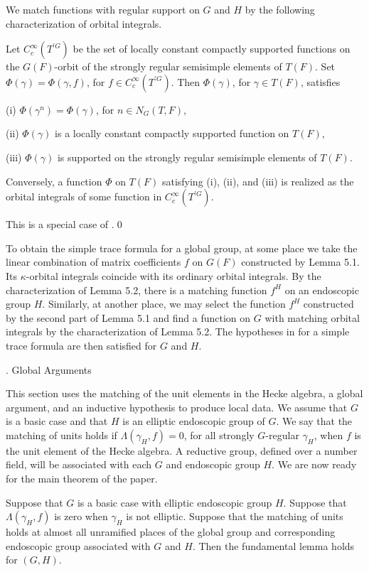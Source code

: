We match functions with regular support on $G$ and $H$ by
the following characterization of orbital integrals.

  Let $C_c^\infty(T^{'G})$ be the set of locally
constant
compactly supported functions on the $G(F)$-orbit of the
strongly regular semisimple elements of $T(F)$.  Set
$\Phi(\gamma) = \Phi(\gamma,f)$, for $f\in C_c^\infty(T^{'G})$.
Then $\Phi(\gamma)$, for $\gamma\in T(F)$,  satisfies

(i)  $\Phi(\gamma^n) = \Phi(\gamma)$, for $n\in N_G(T,F)$,

(ii) $\Phi(\gamma)$ is a locally constant compactly supported
	function on $T(F)$,

(iii) $\Phi(\gamma)$ is supported on the strongly regular semisimple
	elements of $T(F)$.

Conversely, a function $\Phi$ on $T(F)$
satisfying (i), (ii), and (iii) is realized
as the
orbital integrals of some function in $C_c^\infty(T^{'G})$.
\endproclaim

  This is a special case of \cite{Vi}.\qed
\enddemo

\bigskip
To obtain the simple trace formula for a global group, at some place
we take the
linear combination of matrix coefficients
$f$ on $G(F)$ constructed by Lemma 5.1.  Its $\kappa$-orbital
integrals coincide with its ordinary orbital integrals.
By the characterization of Lemma 5.2, 
there is a matching function $f^H$ on an
endoscopic group $H$.  Similarly, at another place, we may
select the function $f^H$ constructed by the second part of
Lemma 5.1 and find a function on $G$ with matching orbital
integrals by the characterization of Lemma 5.2. 
The hypotheses in \cite{He} for a simple trace formula
are then satisfied for $G$ and $H$.


.  Global Arguments \endhead

This section uses the
matching of the unit elements in the Hecke algebra, 
a global argument, and an inductive hypothesis to
produce local data.  We assume that $G$ is a basic case
and that $H$ is an elliptic endoscopic group of $G$.
 We say that the matching of units holds if 
$\Lambda(\gamma_H,f)=0$, for all strongly $G$-regular
$\gamma_H$, when $f$ is the unit element of the
Hecke algebra.  A reductive group, defined over a number field,
will be associated with each $G$ and endoscopic group $H$.
We are now ready for the main theorem of the paper.

  Suppose that $G$ is a basic case with
elliptic endoscopic group $H$.  
Suppose that $\Lambda(\gamma_H,f)$ is zero
when $\gamma_H$ is not elliptic.  
Suppose that the matching of units holds
at almost all unramified places of the global group and corresponding
endoscopic group associated with
$G$ and $H$.  Then the fundamental lemma holds for $(G,H)$.
\endproclaim

